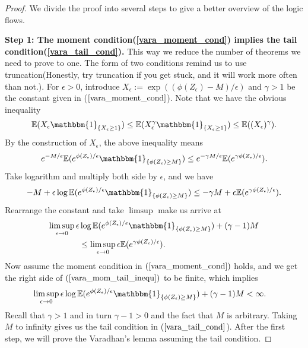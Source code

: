 \documentclass[10pt]{article}
\newcommand{\e}{\mathbb{E}}
\newenvironment{Proof of lemma}{\noindent{\bf Proof of Lemma}}{\hfill$\Box$\newline}
\newenvironment{Proof of claim}{\noindent{\bf Proof of claim}}{\hfill$\Box$\newline}
\newenvironment{Proof of theorem}{\noindent{\bf Proof of Theorem}}{\hfill\scriptsize{$\Box$}\newline}
\newenvironment{Proof of theorems}{\noindent{\bf Proof of Theorems}}{\hfill$\Box$\newline}
\newenvironment{Proof of proposition}{\noindent{\bf Proof of Proposition}}{\hfill$\Box$\newline}
\newenvironment{Proof of propositions}{\noindent{\bf Proof of Propositions}}{\hfill$\Box$\newline}
\newenvironment{Proof of exercise}{\noindent{\it Proof of Exercise:}}{\hfill$\Box$}
\numberwithin{equation}{section}
\begin{document}
\begin{proof}
    We divide the proof into several steps to give a better overview of the logic flows.

    \textbf{Step 1: The moment condition(\ref{vara_moment_cond}) implies the tail condition(\ref{vara_tail_cond}). }
    This way we reduce the number of theorems we need to prove to one. The form of two conditions remind us to use truncation(Honestly, try truncation if you get stuck, and it will work more often than not.). For $\epsilon >0$, introduce $X_{\epsilon}:= \exp ((\phi(Z_{\epsilon})-M)/\epsilon)$ and $\gamma >1$ be the constant given in ($\ref{vara_moment_cond}$). Note that we have the obvious inequality
    \begin{align}
        \e(X_{\epsilon} \mathbbm{1}_{\{X_{\epsilon} \geq 1\}}) \leq \e(X_{\epsilon}^{\gamma} \mathbbm{1}_{\{X_{\epsilon} \geq 1\}}) \leq \e((X_{\epsilon})^{\gamma}).
    \end{align}
    By the construction of $X_{\epsilon}$, the above inequality means
    \begin{align}
        e^{-M/\epsilon} \e(e^{\phi(Z_{\epsilon})/\epsilon}\mathbbm{1}_{\{\phi(Z_{\epsilon}) \geq M\}}) \leq e^{-\gamma M/\epsilon} \e(e^{\gamma\phi(Z_{\epsilon})/\epsilon}).
    \end{align}
    Take logarithm and multiply both side by $\epsilon$, and we have
    \begin{align}
        -M + \epsilon \log \e(e^{\phi(Z_{\epsilon})/\epsilon}\mathbbm{1}_{\{\phi(Z_{\epsilon}) \geq M\}}) \leq -\gamma M + \epsilon \e(e^{\gamma\phi(Z_{\epsilon})/\epsilon}).
    \end{align}
    Rearrange the constant and take $\limsup$ make us arrive at
    \begin{align} \label{vara_mom_tail_inequ}
        \limsup_{\epsilon \to 0}  \epsilon &\log \e(e^{\phi(Z_{\epsilon})/\epsilon}\mathbbm{1}_{\{\phi(Z_{\epsilon}) \geq M\}}) + (\gamma - 1)M \nonumber \\
        &\leq  \limsup_{\epsilon \to 0} \epsilon \e(e^{\gamma\phi(Z_{\epsilon})/\epsilon}).
    \end{align}
    Now assume the moment condition in $(\ref{vara_moment_cond})$ holds, and we get the right side of $(\ref{vara_mom_tail_inequ})$ to be finite, which implies
    \begin{align}
        \limsup_{\epsilon \to 0}  \epsilon &\log \e(e^{\phi(Z_{\epsilon})/\epsilon}\mathbbm{1}_{\{\phi(Z_{\epsilon}) \geq M\}}) + (\gamma - 1)M  < \infty.
    \end{align}
    Recall that $\gamma > 1$ and in turn $\gamma - 1 >0$ and the fact that $M$ is arbitrary. Taking $M$ to infinity gives us the tail condition in ($\ref{vara_tail_cond}$). After the first step, we will prove the Varadhan's lemma assuming the tail condition.


\end{proof}
\end{document}
